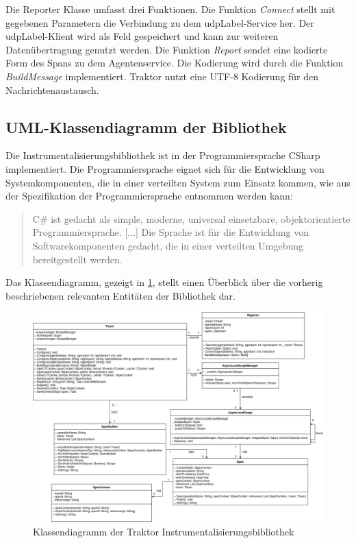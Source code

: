 Die Reporter Klasse umfasst drei Funktionen. Die Funktion \emph{Connect} stellt mit gegebenen Parametern die Verbindung zu dem \gls{udpLabel}-Service her. Der \gls{udpLabel}-Klient wird als Feld gespeichert und kann zur weiteren Datenübertragung genutzt werden. Die Funktion \emph{Report} sendet eine kodierte Form des Spans zu dem Agentenservice. Die Kodierung wird durch die Funktion \emph{BuildMessage} implementiert. Traktor nutzt eine UTF-8 Kodierung für den Nachrichtenaustausch.

\subsection{UML-Klassendiagramm der Bibliothek}
\label{subsection:UML-Klassendiagramm der Bibliothek}

Die Instrumentalisierungsbibliothek ist in der Programmiersprache CSharp implementiert. Die Programmiersprache eignet sich für die Entwicklung von Systemkomponenten, die in einer verteilten System zum Einsatz kommen, wie aus der Spezifikation der Programmiersprache entnommen werden kann: 

\begin{quote}
	\cbstart
	C\# ist gedacht als simple, moderne,  universal einsetzbare, objektorientierte Programmiersprache. [...] Die Sprache ist für die Entwicklung von Softwarekomponenten gedacht, die in einer verteilten Umgebung bereitgestellt werden.
	\cbend
\end{quote}

Das Klassendiagramm, gezeigt in \cref{fig:TraktorKlassendiagramm}, stellt einen Überblick über die vorherig beschriebenen relevanten Entitäten der Bibliothek dar.

\newpage
\begin{landscape}
	\begin{figure}
		\centering
		\includegraphics[scale=0.4]{img/Implementierung/TraktorKlassendiagramm.png}
		\caption[Klassendiagramm der Traktor Instrumentalisierungsbibliothek]{Klassendiagramm der Traktor Instrumentalisierungsbibliothek}
		\label{fig:TraktorKlassendiagramm}
	\end{figure}
\end{landscape}


